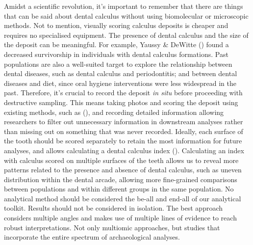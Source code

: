 \documentclass[
  b5paper,
]{book}
\begin{document}
Amidst a scientific revolution, it's important to remember that there
are things that can be said about dental calculus without using
biomolecular or microscopic methods. Not to mention, visually scoring
calculus deposits is cheaper and requires no specialised equipment. The
presence of dental calculus and the size of the deposit can be
meaningful. For example, Yaussy \& DeWitte
() found a decreased
survivorship in individuals with dental calculus formations. Past
populations are also a well-suited target to explore the relationship
between dental diseases, such as dental calculus and periodontitis; and
between dental diseases and diet, since oral hygiene interventions were
less widespread in the past. Therefore, it's crucial to record the
deposit \emph{in situ} before proceeding with destructive sampling. This
means taking photos and scoring the deposit using existing methods, such
as (), and
recording detailed information allowing researchers to filter out
unnecessary information in downstream analyses rather than missing out
on something that was never recorded. Ideally, each surface of the tooth
should be scored separately to retain the most information for future
analyses, and allows calculating a dental calculus index
().
Calculating an index with calculus scored on multiple surfaces of the
teeth allows us to reveal more patterns related to the presence and
absence of dental calculus, such as uneven distribution within the
dental arcade, allowing more fine-grained comparisons between
populations and within different groups in the same population. No
analytical method should be considered the be-all and end-all of our
analytical toolkit. Results should not be considered in isolation. The
best approach considers multiple angles and makes use of multiple lines
of evidence to reach robust interpretations. Not only multiomic
approaches, but studies that incorporate the entire spectrum of
archaeological analyses.
\end{document}
